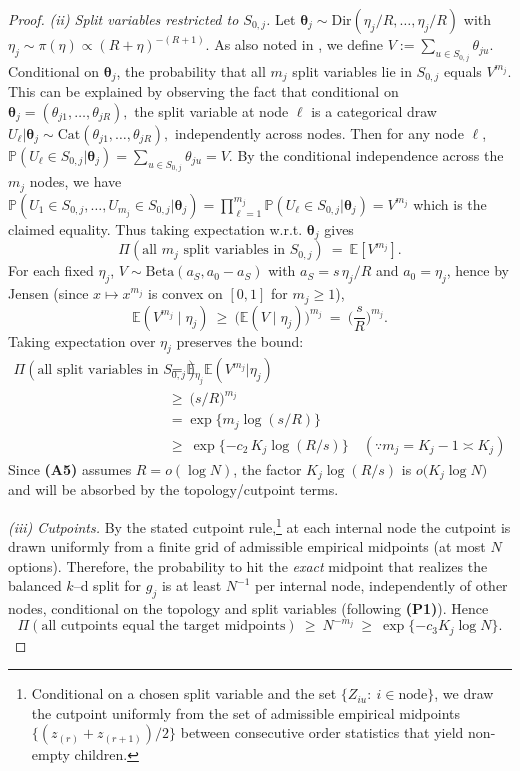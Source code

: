 \documentclass[11pt]{article}
\theoremstyle{plain}
\theoremstyle{definition}
\theoremstyle{plain}
\begin{document}
\begin{proof}
\medskip\noindent\emph{(ii) Split variables restricted to $S_{0,j}$.}
Let $\bm{\theta}_j\sim\mathrm{Dir}(\eta_j/R,\ldots,\eta_j/R)$ with $\eta_j\sim\pi(\eta)\propto (R+\eta)^{-(R+1)}$. As also noted in \citet{Deshpande2024}, we define $V:=\sum_{u\in S_{0,j}}\theta_{ju}$. Conditional on $\bm{\theta}_j$, the probability that all $m_j$ split variables lie in $S_{0,j}$ equals $V^{m_j}$. This can be explained by observing the fact that conditional on $\bm{\theta}_j = (\theta_{j1},\dots,\theta_{jR}),$ the split variable at node $\ell$ is a categorical draw $U_{\ell} \vert \bm{\theta}_j \sim \text{Cat}(\theta_{j1},\dots,\theta_{jR}),$ independently across nodes. Then for any node $\ell$, $\mathbb{P}(U_{\ell} \in S_{0,j} \vert \bm{\theta}_j) = \sum_{u \in S_{0,j}} \theta_{ju} = V.$ By the conditional independence across the $m_j$ nodes, we have $\mathbb{P}(U_1 \in S_{0,j},\dots,U_{m_j} \in S_{0,j} \vert \bm{\theta}_j) = \prod_{\ell=1}^{m_j} \mathbb{P}(U_{\ell} \in S_{0,j} \vert \bm{\theta}_j) = V^{m_j}$ which is the claimed equality.
Thus taking expectation w.r.t. $\bm{\theta}_j$ gives 
\[
\Pi(\text{all $m_j$ split variables in }S_{0,j}) \ =\ \mathbb E[V^{m_j}].
\]
For each fixed $\eta_j$, $V\sim\mathrm{Beta}(a_S,a_0-a_S)$ with $a_S=s\,\eta_j/R$ and $a_0=\eta_j$, hence by Jensen (since $x\mapsto x^{m_j}$ is convex on $[0,1]$ for $m_j\ge1$),
\[
\mathbb E(V^{m_j}\mid\eta_j)\ \ge\ \big(\mathbb E(V\mid\eta_j)\big)^{m_j} \ =\ \Big(\frac{s}{R}\Big)^{m_j}.
\]
Taking expectation over $\eta_j$ preserves the bound:
\begin{equation}\label{eq:splitvar-mass-fixed}
\begin{split}
\Pi(\text{all split variables in }S_{0,j}) & = \mathbb{E}_{\eta_j}\mathbb{E}(V^{m_j} \vert \eta_j) \\
&\ge\ \Big({s}/{R}\Big)^{m_j} \\
& = \exp \{m_j \log(s/R)\}\\
&\ge\ \exp\{-c_2\,K_j\log(R/s)\} \quad (\because m_j =K_j-1 \asymp K_j) 
\end{split}
\end{equation}
Since {\textbf{(A5)}} assumes $R=o(\log N)$, the factor $K_j\log(R/s)$ is $o\big(K_j\log N\big)$ and will be absorbed by the topology/cutpoint terms.

\medskip\noindent\emph{(iii) Cutpoints.}
By the stated cutpoint rule,\footnote{Conditional on a chosen split variable and the set $\{Z_{iu}: \ i \in \text{node}\}$, we draw the cutpoint uniformly from the set of admissible empirical midpoints $\{(z_{(r)}+z_{(r+1)})/2\}$ between consecutive order statistics that yield non-empty children.} at each internal node the cutpoint is drawn uniformly from a finite grid of admissible empirical midpoints (at most $N$ options). Therefore, the probability to hit the \emph{exact} midpoint that realizes the balanced $k$–d split for $g_j$ is at least $N^{-1}$ per internal node, independently of other nodes, conditional on the topology and split variables (following \textbf{(P1)}). Hence
\begin{equation}\label{eq:cut-mass-fixed}
\Pi(\text{all cutpoints equal the target midpoints})\ \ge\ N^{-m_j}\ \ge\ \exp\{-c_3 K_j\log N\}.
\end{equation}


\end{proof}
\end{document}
